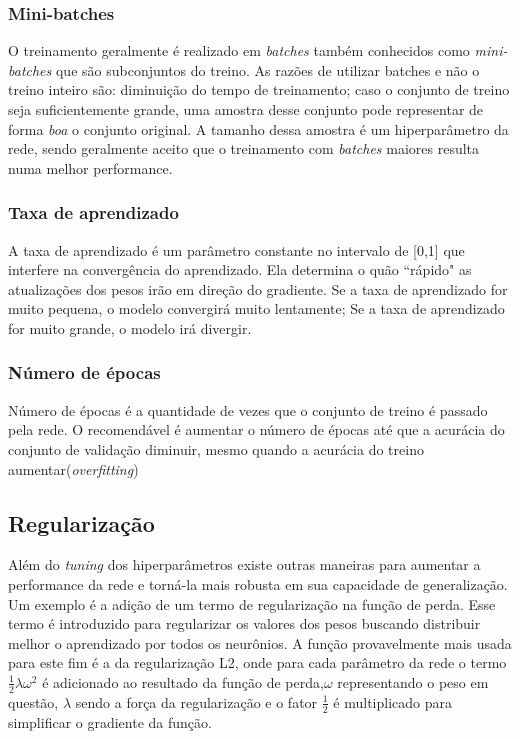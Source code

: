 \subsubsection{Mini-batches}
O treinamento geralmente é realizado em \textit{batches} também conhecidos como \textit{mini-batches} que são subconjuntos do treino. As razões de utilizar batches e não o treino inteiro são: diminuição do tempo de treinamento; caso o conjunto de treino seja suficientemente grande, uma amostra desse conjunto pode representar de forma \textit{boa} o conjunto original. A tamanho dessa amostra é um hiperparâmetro da rede, sendo geralmente aceito que o treinamento com \textit{batches} maiores resulta numa melhor performance.

\subsubsection{Taxa de aprendizado}

A taxa de aprendizado é um parâmetro constante no intervalo de [0,1] que interfere na convergência do aprendizado. Ela determina o quão ``rápido" as atualizações dos pesos irão em direção do gradiente. Se a taxa de aprendizado for muito pequena, o modelo convergirá muito lentamente; Se a taxa de aprendizado for muito grande, o modelo irá divergir. 

\subsubsection{Número de épocas}
Número de épocas é a quantidade de vezes que o conjunto de treino é passado pela rede. O recomendável é aumentar o número de épocas até que a acurácia do conjunto de validação diminuir, mesmo quando a acurácia do treino aumentar(\textit{overfitting})

\subsection{Regularização}

Além do \textit{tuning} dos hiperparâmetros existe outras maneiras para aumentar a performance da rede e torná-la mais robusta em sua capacidade de generalização. 
Um exemplo é a adição de um termo de regularização na função de perda. Esse termo é introduzido para regularizar os valores dos pesos buscando distribuir melhor o aprendizado por todos os neurônios. A função provavelmente mais usada para este fim é a da regularização L2, onde para cada parâmetro da rede o termo $\frac{1}{2}\lambda \omega^2$ é adicionado ao resultado da função de perda,$\omega$ representando o peso em questão, $\lambda$ sendo a força da regularização e o fator $\frac{1}{2}$ é multiplicado para simplificar o gradiente da função.

